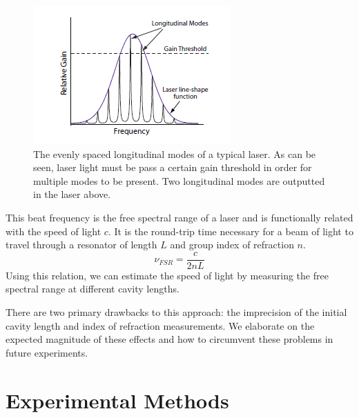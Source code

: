 \documentclass[journal, a4paper]{IEEEtran}
\begin{document}
\begin{figure}[!hbt]
		\begin{center}
		\includegraphics[width=\columnwidth]{longitudinal_modes.png}
		\caption{The evenly spaced longitudinal modes of a typical laser. \cite{beat}  As can be seen, laser light must be pass a certain gain threshold in order for multiple modes to be present. Two longitudinal modes are outputted in the laser above.}
		
		\label{fig:tf_plot}
		\end{center}
	\end{figure}



This beat frequency is the free spectral range of a laser and is functionally related with the speed of light $c$. It is the round-trip time necessary for a beam of light to travel through a resonator of length $L$ and group index of refraction $n$.
$$ \nu_{FSR} =  \frac{c}{2nL} $$
Using this  relation, we can estimate the speed of light by measuring the free spectral range at different cavity lengths.

There are two primary drawbacks to this approach: the imprecision of the initial cavity length and index of refraction measurements. We elaborate on the expected magnitude of these effects and how to circumvent these problems in future experiments.

\section{Experimental Methods}
\end{document}
